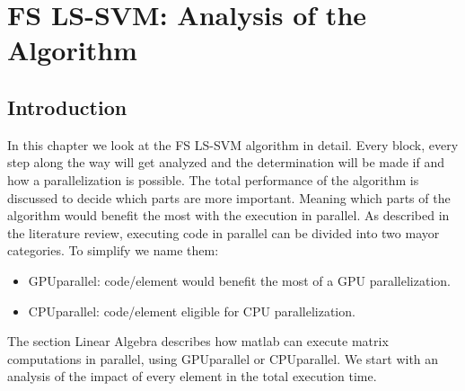 
\chapter{FS LS-SVM: Analysis of the Algorithm}
\section{Introduction}
In this chapter we look at the FS LS-SVM algorithm in detail.
Every block, every step along the way will get analyzed and the determination will be made if and how a parallelization is possible.
The total performance of the algorithm is discussed to decide which parts are more important.
Meaning which parts of the algorithm would benefit the most with the execution in parallel.
As described in the literature review, executing code in parallel can be divided into two mayor categories.
To simplify we name them:
\begin{itemize}
	\item GPUparallel: code/element would benefit the most of a GPU parallelization.
	\item CPUparallel: code/element eligible for CPU parallelization.
\end{itemize}
The section Linear Algebra describes how matlab can execute matrix computations in parallel, using GPUparallel or CPUparallel.
We start with an analysis of the impact of every element in the total execution time.
